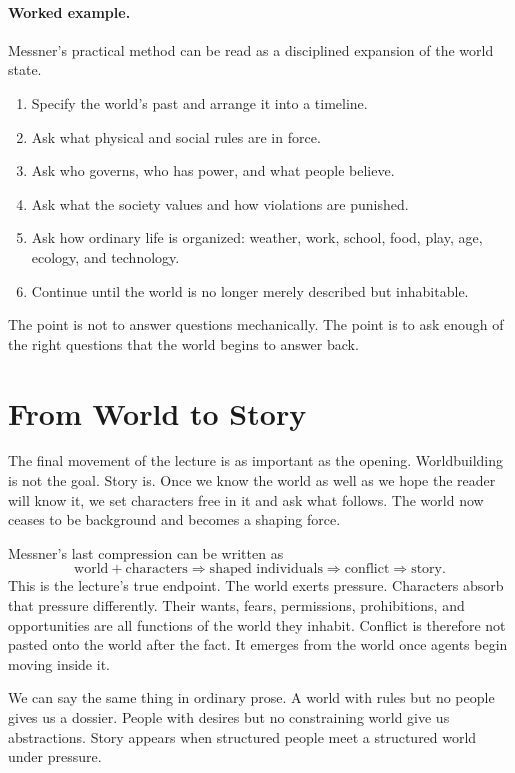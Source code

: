\paragraph{Worked example.} Messner's practical method can be read as a disciplined expansion of the world state.
\begin{enumerate}
\item Specify the world's past and arrange it into a timeline.
\item Ask what physical and social rules are in force.
\item Ask who governs, who has power, and what people believe.
\item Ask what the society values and how violations are punished.
\item Ask how ordinary life is organized: weather, work, school, food, play, age, ecology, and technology.
\item Continue until the world is no longer merely described but inhabitable.
\end{enumerate}
The point is not to answer questions mechanically. The point is to ask enough of the right questions that the world begins to answer back.

\section{From World to Story}

The final movement of the lecture is as important as the opening. Worldbuilding is not the goal. Story is. Once we know the world as well as we hope the reader will know it, we set characters free in it and ask what follows. The world now ceases to be background and becomes a shaping force.

Messner's last compression can be written as
\begin{equation}
\text{world} + \text{characters} \Rightarrow \text{shaped individuals} \Rightarrow \text{conflict} \Rightarrow \text{story}.
\end{equation}
This is the lecture's true endpoint. The world exerts pressure. Characters absorb that pressure differently. Their wants, fears, permissions, prohibitions, and opportunities are all functions of the world they inhabit. Conflict is therefore not pasted onto the world after the fact. It emerges from the world once agents begin moving inside it.

We can say the same thing in ordinary prose. A world with rules but no people gives us a dossier. People with desires but no constraining world give us abstractions. Story appears when structured people meet a structured world under pressure.

